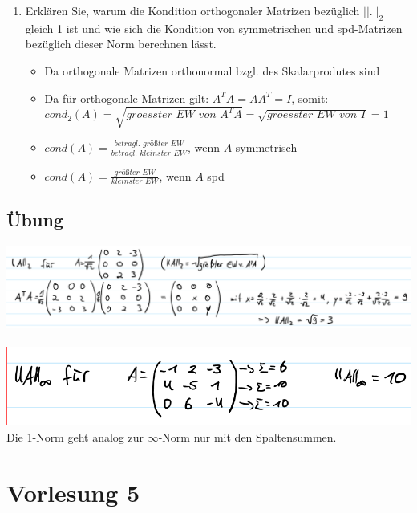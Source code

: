 \documentclass[]{article}
\begin{document}
\begin{enumerate}
\begin{itemize}
			\end{itemize}
		\item Erklären Sie, warum die Kondition orthogonaler Matrizen bezüglich $||.||_2$ gleich 1 ist und wie sich die Kondition von symmetrischen und spd-Matrizen bezüglich dieser Norm berechnen lässt.  
			\begin{itemize}
				\item Da orthogonale Matrizen orthonormal bzgl. des Skalarprodutes sind
				\item Da für orthogonale Matrizen gilt: $A^TA = AA^T = I$, somit: \newline $cond_2(A) = \sqrt{\textit{groesster EW von } A^TA} = \sqrt{\textit{groesster EW von } I} = 1$
				\item $cond(A) = \frac{\textit{betragl. größter EW}}{\textit{betragl. kleinster EW}}$, wenn $A$ symmetrisch
                \item $cond(A) = \frac{\textit{größter EW}}{\textit{kleinster EW}}$, wenn $A$ spd
			\end{itemize}
	\end{enumerate}
\subsection{Übung}
	\includegraphics[width=\textwidth]{res/vl4-1.png}
	\\ \\
	\includegraphics[width=\textwidth]{res/vl4-2.png}
	\\
	Die 1-Norm geht analog zur $\infty$-Norm nur mit den Spaltensummen.

\section{Vorlesung 5}
\end{document}
